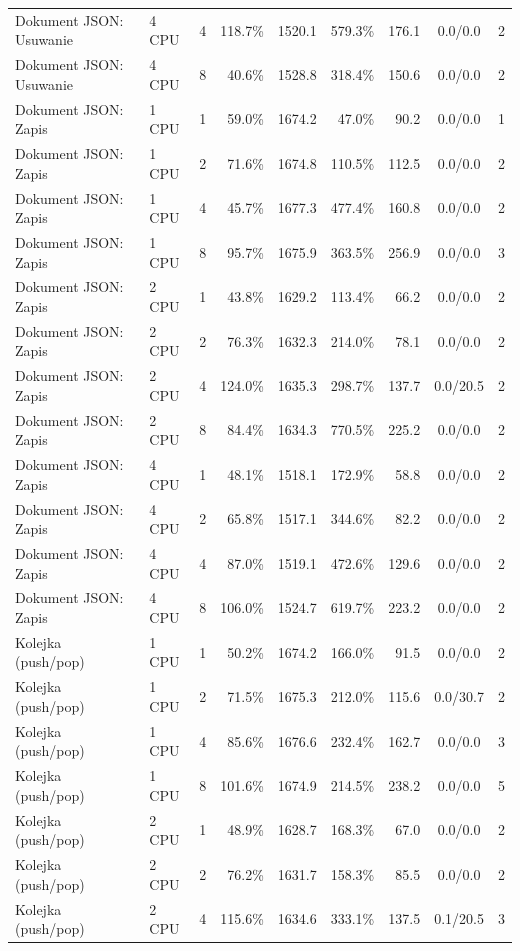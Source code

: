 \begin{table}[ht]
{\begin{tabular}{llcrrrrcc}
Dokument JSON: Usuwanie & 4 CPU & 4 & 118.7\% & 1520.1 & 579.3\% & 176.1 & 0.0/0.0 & 2 \\
Dokument JSON: Usuwanie & 4 CPU & 8 & 40.6\% & 1528.8 & 318.4\% & 150.6 & 0.0/0.0 & 2 \\
Dokument JSON: Zapis & 1 CPU & 1 & 59.0\% & 1674.2 & 47.0\% & 90.2 & 0.0/0.0 & 1 \\
Dokument JSON: Zapis & 1 CPU & 2 & 71.6\% & 1674.8 & 110.5\% & 112.5 & 0.0/0.0 & 2 \\
Dokument JSON: Zapis & 1 CPU & 4 & 45.7\% & 1677.3 & 477.4\% & 160.8 & 0.0/0.0 & 2 \\
Dokument JSON: Zapis & 1 CPU & 8 & 95.7\% & 1675.9 & 363.5\% & 256.9 & 0.0/0.0 & 3 \\
Dokument JSON: Zapis & 2 CPU & 1 & 43.8\% & 1629.2 & 113.4\% & 66.2 & 0.0/0.0 & 2 \\
Dokument JSON: Zapis & 2 CPU & 2 & 76.3\% & 1632.3 & 214.0\% & 78.1 & 0.0/0.0 & 2 \\
Dokument JSON: Zapis & 2 CPU & 4 & 124.0\% & 1635.3 & 298.7\% & 137.7 & 0.0/20.5 & 2 \\
Dokument JSON: Zapis & 2 CPU & 8 & 84.4\% & 1634.3 & 770.5\% & 225.2 & 0.0/0.0 & 2 \\
Dokument JSON: Zapis & 4 CPU & 1 & 48.1\% & 1518.1 & 172.9\% & 58.8 & 0.0/0.0 & 2 \\
Dokument JSON: Zapis & 4 CPU & 2 & 65.8\% & 1517.1 & 344.6\% & 82.2 & 0.0/0.0 & 2 \\
Dokument JSON: Zapis & 4 CPU & 4 & 87.0\% & 1519.1 & 472.6\% & 129.6 & 0.0/0.0 & 2 \\
Dokument JSON: Zapis & 4 CPU & 8 & 106.0\% & 1524.7 & 619.7\% & 223.2 & 0.0/0.0 & 2 \\
Kolejka (push/pop) & 1 CPU & 1 & 50.2\% & 1674.2 & 166.0\% & 91.5 & 0.0/0.0 & 2 \\
Kolejka (push/pop) & 1 CPU & 2 & 71.5\% & 1675.3 & 212.0\% & 115.6 & 0.0/30.7 & 2 \\
Kolejka (push/pop) & 1 CPU & 4 & 85.6\% & 1676.6 & 232.4\% & 162.7 & 0.0/0.0 & 3 \\
Kolejka (push/pop) & 1 CPU & 8 & 101.6\% & 1674.9 & 214.5\% & 238.2 & 0.0/0.0 & 5 \\
Kolejka (push/pop) & 2 CPU & 1 & 48.9\% & 1628.7 & 168.3\% & 67.0 & 0.0/0.0 & 2 \\
Kolejka (push/pop) & 2 CPU & 2 & 76.2\% & 1631.7 & 158.3\% & 85.5 & 0.0/0.0 & 2 \\
Kolejka (push/pop) & 2 CPU & 4 & 115.6\% & 1634.6 & 333.1\% & 137.5 & 0.1/20.5 & 3 \\

\end{tabular}}
\end{table}
